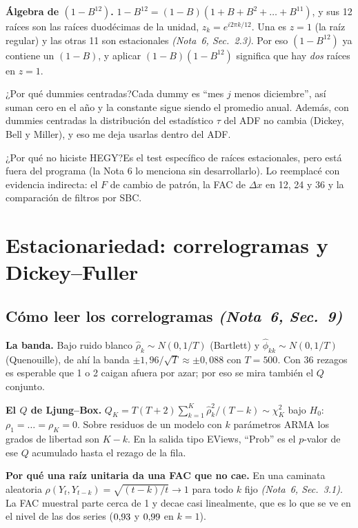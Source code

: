 \documentclass[11pt,a4paper]{article}
\newcommand{\nota}[2]{\textit{(Nota~#1, Sec.~#2)}}
\newcommand{\Q}[2]{\begin{pregunta}{#1}#2\end{pregunta}}
\begin{document}
\textbf{\'Algebra de $(1-B^{12})$.} $1-B^{12}=(1-B)(1+B+B^2+\dots+B^{11})$, y sus 12 ra\'ices son las ra\'ices duod\'ecimas de la unidad, $z_k=e^{i2\pi k/12}$. Una es $z=1$ (la ra\'iz regular) y las otras 11 son estacionales \nota{6}{2.3}. Por eso $(1-B^{12})$ ya contiene un $(1-B)$, y aplicar $(1-B)(1-B^{12})$ significa que hay \emph{dos} ra\'ices en $z=1$.

\Q{¿Por qu\'e dummies centradas?}{Cada dummy es ``mes $j$ menos diciembre'', as\'i suman cero en el a\~no y la constante sigue siendo el promedio anual. Adem\'as, con dummies centradas la distribuci\'on del estad\'istico $\tau$ del ADF no cambia (Dickey, Bell y Miller), y eso me deja usarlas dentro del ADF.}

\Q{¿Por qu\'e no hiciste HEGY?}{Es el test espec\'ifico de ra\'ices estacionales, pero est\'a fuera del programa (la Nota 6 lo menciona sin desarrollarlo). Lo reemplac\'e con evidencia indirecta: el $F$ de cambio de patr\'on, la FAC de $\Delta x$ en 12, 24 y 36 y la comparaci\'on de filtros por SBC.}

\section{Estacionariedad: correlogramas y Dickey--Fuller}

\subsection{C\'omo leer los correlogramas \nota{6}{9}}
\textbf{La banda.} Bajo ruido blanco $\hat\rho_k\sim N(0,1/T)$ (Bartlett) y $\hat\phi_{kk}\sim N(0,1/T)$ (Quenouille), de ah\'i la banda $\pm1{,}96/\sqrt T\approx\pm0{,}088$ con $T=500$. Con 36 rezagos es esperable que 1 o 2 caigan afuera por azar; por eso se mira tambi\'en el $Q$ conjunto.

\textbf{El $Q$ de Ljung--Box.} $Q_K=T(T+2)\sum_{k=1}^K\hat\rho_k^2/(T-k)\sim\chi^2_K$ bajo $H_0$: $\rho_1=\dots=\rho_K=0$. Sobre residuos de un modelo con $k$ par\'ametros ARMA los grados de libertad son $K-k$. En la salida tipo EViews, ``Prob'' es el $p$-valor de ese $Q$ acumulado hasta el rezago de la fila.

\textbf{Por qu\'e una ra\'iz unitaria da una FAC que no cae.} En una caminata aleatoria $\rho(Y_t,Y_{t-k})=\sqrt{(t-k)/t}\to1$ para todo $k$ fijo \nota{6}{3.1}. La FAC muestral parte cerca de 1 y decae casi linealmente, que es lo que se ve en el nivel de las dos series ($0{,}93$ y $0{,}99$ en $k=1$).
\end{document}
